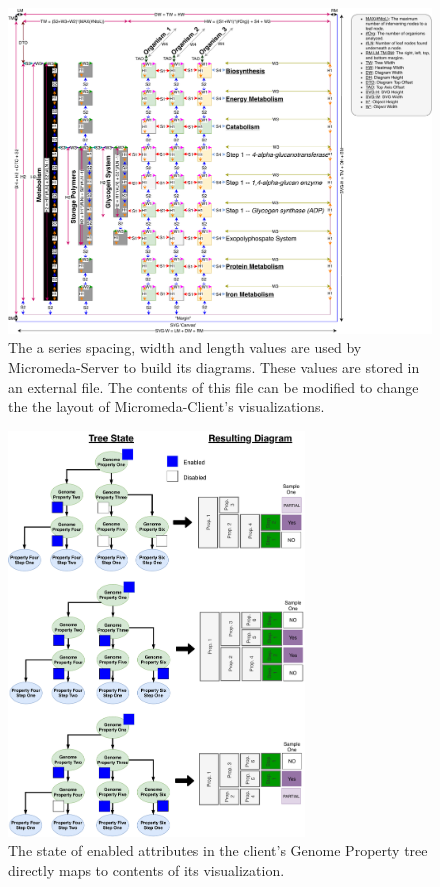 \begin{figure}[!ht]
  \centering
	\includegraphics[width=\textwidth]{media/diagram_measurements.pdf}
	 \caption{The a series spacing, width and length values are used by Micromeda-Server to build its diagrams. These values are stored in an external file. The contents of this file can be modified to change the the layout of Micromeda-Client's visualizations.}
	 \label{fig:diagram-measurements}
\end{figure}

\begin{figure}[!ht]
  \centering
	\includegraphics[width=0.7\textwidth]{media/how_tree_state_maps.pdf}
	 \caption{The state of enabled attributes in the client's Genome Property tree directly maps to contents of its visualization.}
	 \label{fig:tree-map-to-viz}
\end{figure}

